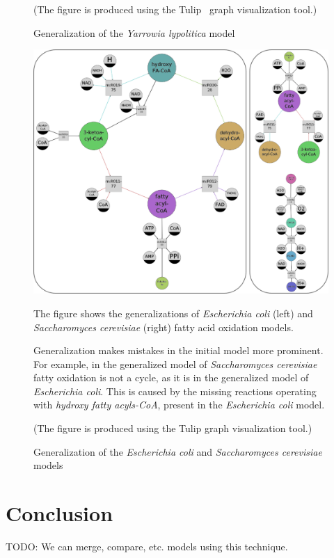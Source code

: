 \documentclass[10pt]{bmc_article}
\newenvironment{bmcformat}{\baselineskip20pt\sloppy\setboolean{publ}{false}}{\baselineskip20pt\sloppy}
\begin{document}
\begin{bmcformat}
\begin{figure}
      (The figure is produced using the Tulip~\cite{Auber04} graph visualization tool.)
\caption{Generalization of the \textit{Yarrowia lypolitica} model}
\label{fig:yali}
\end{figure}

\begin{figure}
\includegraphics[]{pics/sace_ecoli.png} 

      The figure shows the generalizations of \textit{Escherichia coli} (left) and \textit{Saccharomyces cerevisiae} (right) fatty acid oxidation models.
      
      Generalization makes mistakes in the initial model more prominent. For example, in the generalized model of \textit{Saccharomyces cerevisiae} fatty oxidation is not a cycle, as it is in the generalized model of \textit{Escherichia coli}.  This is caused by the missing reactions operating with \textit{hydroxy fatty acyls-CoA}, present in the \textit{Escherichia coli} model.
      
      (The figure is produced using the Tulip graph visualization tool.)
\caption{Generalization of the \textit{Escherichia coli} and \textit{Saccharomyces cerevisiae} models}
\label{fig:gen}
\end{figure}


\section*{Conclusion}
TODO: We can merge, compare, etc. models using this technique.


\end{bmcformat}
\end{document}
